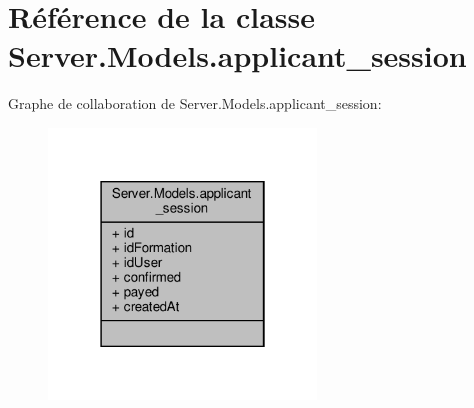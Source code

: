 \hypertarget{class_server_1_1_models_1_1applicant__session}{}\section{Référence de la classe Server.\+Models.\+applicant\+\_\+session}
\label{class_server_1_1_models_1_1applicant__session}


Graphe de collaboration de Server.\+Models.\+applicant\+\_\+session\+:
\nopagebreak
\begin{figure}[H]
\begin{center}
\leavevmode
\includegraphics[width=202pt]{class_server_1_1_models_1_1applicant__session__coll__graph}
\end{center}
\end{figure}
